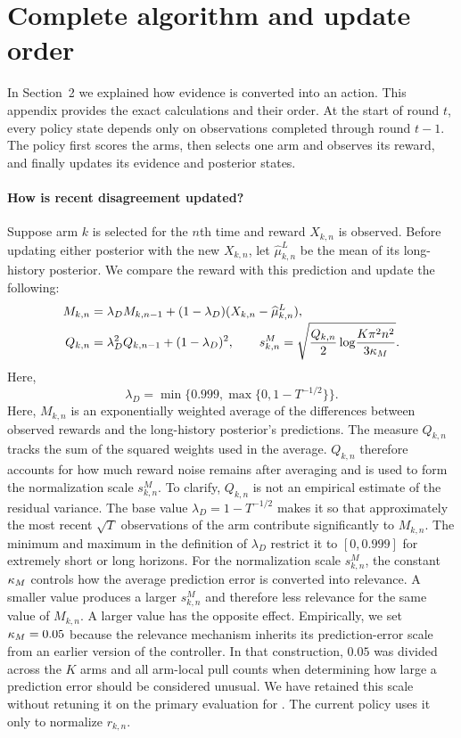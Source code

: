 \section{Complete algorithm and update order}
\label{app:algorithm}

In Section~2 we explained how evidence is converted into an action.
This appendix provides the exact calculations and their order.
At the start of round $t$, every policy state depends only on observations completed through round
$t-1$.
The policy first scores the arms, then selects one arm and observes its reward, and finally updates its evidence and posterior states.

\paragraph{How is recent disagreement updated?}
Suppose arm $k$ is selected for the $n$th time and reward $X_{k,n}$ is observed.
Before updating either posterior with the new $X_{k,n}$, let $\widehat\mu^L_{k,n}$ be the mean of its long-history posterior.
We compare the reward with this prediction and update the following:
\begin{align}
 M_{k,n}
 &=
 \lambda_D M_{k,n-1}
 +(1-\lambda_D)(X_{k,n}-\widehat\mu^L_{k,n}),
 \nonumber\\[-2pt]
 Q_{k,n}
 &=
 \lambda_D^2Q_{k,n-1}+(1-\lambda_D)^2,
 \qquad
 s^M_{k,n}
 =
 \sqrt{\frac{Q_{k,n}}{2}
 \log\!\frac{K\pi^2n^2}{3\kappa_M}} .
 \label{eq:mean}
\end{align}
Here,
\[
 \lambda_D
 =
 \min\{0.999,\max\{0,1-T^{-1/2}\}\}.
\]
Here, $M_{k,n}$ is an exponentially weighted average of the differences between observed rewards and the long-history posterior's predictions.
The measure $Q_{k,n}$ tracks the sum of the squared weights used in the average.
$Q_{k,n}$ therefore accounts for how much reward noise remains after averaging and is used to form the normalization scale $s^M_{k,n}$.
To clarify, $Q_{k,n}$ is not an empirical estimate of the residual variance.
The base value $\lambda_D=1-T^{-1/2}$ makes it so that approximately the most recent $\sqrt T$ observations of the arm contribute significantly to $M_{k,n}$.
The minimum and maximum in the definition of $\lambda_D$ restrict it to $[0,0.999]$ for extremely short or long horizons.
For the normalization scale $s^M_{k,n}$, the constant $\kappa_M$ controls how the average prediction error is converted
into relevance.
A smaller value produces a larger $s^M_{k,n}$ and therefore less relevance for the same value of $M_{k,n}$.
A larger value has the opposite effect.
Empirically, we set $\kappa_M=0.05$ because the relevance mechanism inherits its
prediction-error scale from an earlier version of the controller.
In that construction, $0.05$ was divided across the $K$ arms and all arm-local pull
counts when determining how large a prediction error should be considered
unusual.
We have retained this scale without retuning it on the primary
evaluation for \method{}.
The current policy uses it only to normalize $r_{k,n}$.

